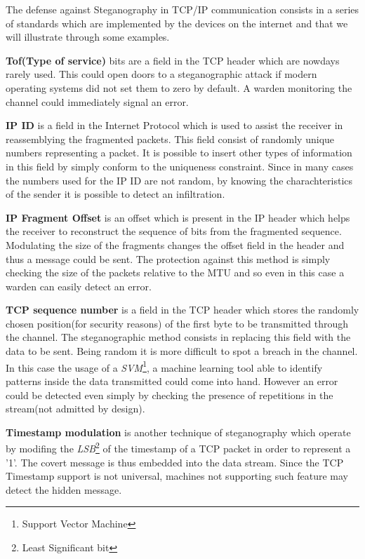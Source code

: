 \documentclass[../../main.tex]{subfiles}
\begin{document}
    The defense against Steganography in TCP/IP communication consists in a series of standards which are implemented by the devices on the internet and that we will illustrate through some examples.


    \textbf{Tof(Type of service)} bits are a field in the TCP header which are nowdays rarely used. This could open doors to a steganographic attack if modern operating systems did not set them to zero by default. A warden monitoring the channel could immediately signal an error.

    \textbf{IP ID} is a field in the Internet Protocol which is used to assist the receiver in reassemblying the fragmented packets. This field consist of randomly unique numbers representing a packet.
    It is possible to insert other types of information in this field by simply conform to the uniqueness constraint. Since in many cases the numbers used for the IP ID are not random, by knowing the charachteristics of the sender it is possible
    to detect an infiltration.

    \textbf{IP Fragment Offset} is an offset which is present in the IP header which helps the receiver to reconstruct the sequence of bits from the fragmented sequence.
    Modulating the size of the fragments changes the offset field in the header and thus a message could be sent. The protection against this method is simply checking the size of the packets relative to the MTU and so even
    in this case a warden can easily detect an error.

    \textbf{TCP sequence number} is a field in the TCP header which stores the randomly chosen position(for security reasons) of the first byte to be transmitted through the channel. The steganographic method consists in replacing this field with the data to be sent.
    Being random it is more difficult to spot a breach in the channel. In this case the usage of a \emph{SVM}\footnote{Support Vector Machine}, a machine learning tool able to identify patterns inside the data transmitted could come into hand.
    However an error could be detected even simply by checking the presence of repetitions in the stream(not admitted by design). 

    \textbf{Timestamp modulation} is another technique of steganography which operate by modifing the \emph{LSB}\footnote{Least Significant bit} of the timestamp of a TCP packet in order to represent a '1'.
    The covert message is thus embedded into the data stream. Since the TCP Timestamp support is not universal, machines not supporting such feature may detect the hidden message.

    \pagebreak
\end{document}
